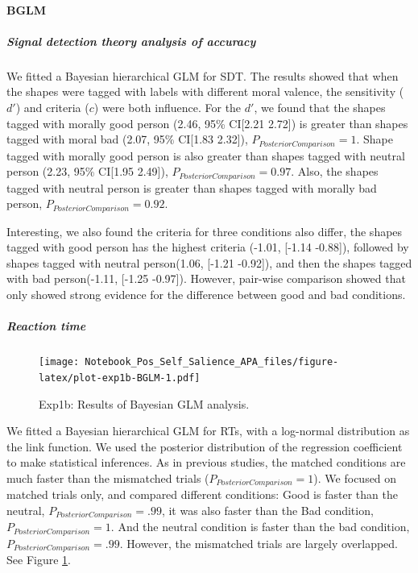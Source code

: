 \documentclass[
  english,
  man]{apa6}
\let\oldparagraph\paragraph
\renewcommand{\paragraph}[1]{\oldparagraph{#1}\mbox{}}
\let\oldsubparagraph\subparagraph
\renewcommand{\subparagraph}[1]{\oldsubparagraph{#1}\mbox{}}
\begin{document}
\hypertarget{bglm}{%
\paragraph{BGLM}\label{bglm}}

\hypertarget{signal-detection-theory-analysis-of-accuracy}{%
\subparagraph{Signal detection theory analysis of accuracy}\label{signal-detection-theory-analysis-of-accuracy}}

We fitted a Bayesian hierarchical GLM for SDT. The results showed that when the shapes were tagged with labels with different moral valence, the sensitivity (\(d'\)) and criteria (\(c\)) were both influence. For the \(d'\), we found that the shapes tagged with morally good person (2.46, 95\% CI{[}2.21 2.72{]}) is greater than shapes tagged with moral bad (2.07, 95\% CI{[}1.83 2.32{]}), \(P_{PosteriorComparison} = 1\). Shape tagged with morally good person is also greater than shapes tagged with neutral person (2.23, 95\% CI{[}1.95 2.49{]}), \(P_{PosteriorComparison} = 0.97\). Also, the shapes tagged with neutral person is greater than shapes tagged with morally bad person, \(P_{PosteriorComparison} = 0.92\).

Interesting, we also found the criteria for three conditions also differ, the shapes tagged with good person has the highest criteria (-1.01, {[}-1.14 -0.88{]}), followed by shapes tagged with neutral person(1.06, {[}-1.21 -0.92{]}), and then the shapes tagged with bad person(-1.11, {[}-1.25 -0.97{]}). However, pair-wise comparison showed that only showed strong evidence for the difference between good and bad conditions.

\hypertarget{reaction-time}{%
\subparagraph{Reaction time}\label{reaction-time}}

\begin{figure}
\centering
\texttt{[image: Notebook\_Pos\_Self\_Salience\_APA\_files/figure-latex/plot-exp1b-BGLM-1.pdf]}
\caption{\label{fig:plot-exp1b-BGLM}Exp1b: Results of Bayesian GLM analysis.}
\end{figure}

We fitted a Bayesian hierarchical GLM for RTs, with a log-normal distribution as the link function. We used the posterior distribution of the regression coefficient to make statistical inferences. As in previous studies, the matched conditions are much faster than the mismatched trials (\(P_{PosteriorComparison} = 1\)). We focused on matched trials only, and compared different conditions: Good is faster than the neutral, \(P_{PosteriorComparison} = .99\), it was also faster than the Bad condition, \(P_{PosteriorComparison} = 1\). And the neutral condition is faster than the bad condition, \(P_{PosteriorComparison} = .99\). However, the mismatched trials are largely overlapped. See Figure \ref{fig:plot-exp1b-BGLM}.
\end{document}
